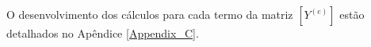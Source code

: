 \documentclass[
12pt,
a4paper,
oneside,
chapter=TITLE,
sumario=tradicional
]{abntex2}
\begin{document}
O desenvolvimento dos cálculos para cada termo da matriz $[Y^{(e)}]$ estão detalhados no Apêndice \ref{Appendix_C}.
	
	
	
	


\end{document}

